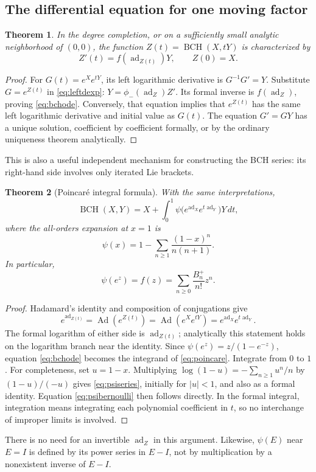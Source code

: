 \documentclass[11pt]{article}
\numberwithin{equation}{section}
\newtheorem{theorem}{Theorem}[section]
\theoremstyle{definition}
\theoremstyle{remark}
\DeclareMathOperator{\ad}{ad}
\DeclareMathOperator{\Ad}{Ad}
\DeclareMathOperator{\BCH}{BCH}
\newcommand{\dt}{\,dt}
\begin{document}
\subsection{The differential equation for one moving factor}
\begin{theorem}\label{thm:bchode}
In the degree completion, or on a sufficiently small analytic
neighborhood of $(0,0)$, the function
$Z(t)=\BCH(X,tY)$ is characterized by
\begin{equation}\label{eq:bchode}
 Z'(t)=f(\ad_{Z(t)})Y,
 \qquad Z(0)=X.
\end{equation}
\end{theorem}
\begin{proof}
For $G(t)=e^Xe^{tY}$, its left logarithmic derivative is
$G^{-1}G'=Y$. Substitute $G=e^{Z(t)}$ in \eqref{eq:leftdexp}:
$Y=\phi_-(\ad_Z)Z'$. Its formal inverse is $f(\ad_Z)$, proving
\eqref{eq:bchode}. Conversely, that equation implies that $e^{Z(t)}$
has the same left logarithmic derivative and initial value as $G(t)$.
The equation $G'=GY$ has a unique solution, coefficient by coefficient
formally, or by the ordinary uniqueness theorem analytically.
\end{proof}
This is also a useful independent mechanism for constructing the BCH
series: its right-hand side involves only iterated Lie brackets.

\begin{theorem}[Poincar\'e integral formula]\label{thm:poincare}
With the same interpretations,
\begin{equation}\label{eq:poincare}
 \BCH(X,Y)=X+\int_0^1
 \psi\bigl(e^{\ad_X}e^{t\ad_Y}\bigr)Y\dt,
\end{equation}
where the all-orders expansion at $x=1$ is
\begin{equation}\label{eq:psiseries}
 \psi(x)=1-\sum_{n\geq1}\frac{(1-x)^n}{n(n+1)}.
\end{equation}
In particular,
\begin{equation}\label{eq:psibernoulli}
 \psi(e^z)=f(z)=\sum_{n\geq0}\frac{B_n^+}{n!}z^n.
\end{equation}
\end{theorem}
\begin{proof}
Hadamard's identity and composition of conjugations give
\[
 e^{\ad_{Z(t)}}=\Ad(e^{Z(t)})
 =\Ad(e^Xe^{tY})=e^{\ad_X}e^{t\ad_Y}.
\]
The formal logarithm of either side is $\ad_{Z(t)}$; analytically this
statement holds on the logarithm branch near the identity. Since
$\psi(e^z)=z/(1-e^{-z})$, equation \eqref{eq:bchode} becomes the
integrand of \eqref{eq:poincare}. Integrate from $0$ to $1$.
For completeness, set $u=1-x$. Multiplying
$\log(1-u)=-\sum_{n\geq1}u^n/n$ by $(1-u)/(-u)$ gives
\eqref{eq:psiseries}, initially for $|u|<1$, and also as a formal
identity. Equation \eqref{eq:psibernoulli} then follows directly.
In the formal integral, integration means integrating each polynomial
coefficient in $t$, so no interchange of improper limits is involved.
\end{proof}
There is no need for an invertible $\ad_Z$ in this argument. Likewise,
$\psi(E)$ near $E=I$ is defined by its power series in $E-I$, not by
multiplication by a nonexistent inverse of $E-I$.
\end{document}
